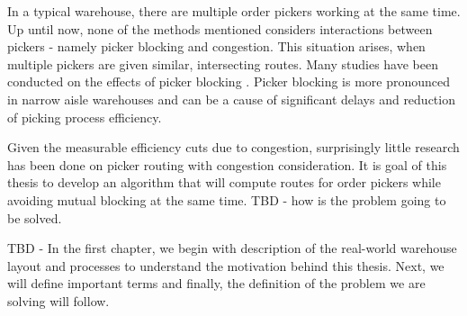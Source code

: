 In a typical warehouse, there are multiple order pickers working at the same time. Up until now, none of the methods mentioned considers interactions between pickers - namely picker blocking and congestion. This situation arises, when multiple pickers are given similar, intersecting routes. Many studies have been conducted on the effects of picker blocking \cite{pan2012}\cite{heath2013}\cite{klodawski2018}. Picker blocking is more pronounced in narrow aisle warehouses and can be a cause of significant delays and reduction of picking process efficiency. 
\par

Given the measurable efficiency cuts due to congestion, surprisingly little research has been done on picker routing with congestion consideration. It is goal of this thesis  to develop an algorithm that will compute routes for order pickers while avoiding mutual blocking at the same time.   TBD - how is the problem going to be solved.

 TBD - In the first chapter, we begin with description of the real-world warehouse layout and processes to understand the motivation behind this thesis. Next, we will define important terms and finally, the definition of the problem we are solving will follow.
